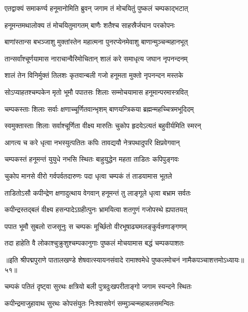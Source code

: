 \twolineshloka
{एतद्वाक्यं समाकर्ण्य हनूमानोमिति ब्रुवन्}
{जगाम तं मोचयितुं पुष्कलं चम्पकाद्भटात्}%

\twolineshloka
{हनूमन्तमथालोक्य तं मोचयितुमागतम्}
{बाणैः शतैश्च साहस्रैर्जघान परकोपनः}%

\twolineshloka
{बाणांस्तान्स बभञ्जाशु मुक्तांस्तेन महात्मना}
{पुनरप्येनमेवाशु बाणान्मुञ्चन्महानभूत्}%

\twolineshloka
{तान्सर्वांश्चूर्णयामास नाराचान्वैरिमोचितान्}
{शालं करे समाधृत्य जघान नृपनन्दनम्}%

\twolineshloka
{शालं तेन विनिर्मुक्तं तिलशः कृतवान्बली}
{गजो हनूमता मुक्तो नृपनन्दन मस्तके}%

\twolineshloka
{सोऽप्याहतश्चम्पकेन मृतो भूमौ पपातसः}
{शिलाः सम्मोचयामास हनूमान्परमास्त्रवित्}%

\twolineshloka
{चम्पकस्ताः शिलाः सर्वाः क्षणाच्चूर्णितवान्भृशम्}
{बाणयन्त्रिकया ब्रह्मन्महच्चित्रमभूदिदम्}%

\twolineshloka
{स्वमुक्तास्ताः शिलाः सर्वाश्चूर्णिता वीक्ष्य मारुतिः}
{चुकोप हृदयेऽत्यतं बहुवीर्यमिति स्मरन्}%

\twolineshloka
{आगत्य च करे धृत्वा नभस्युत्पतितः कपिः}
{तावद्ययौ नेत्रपथादुपरि क्षिप्रवेगवान्}%

\twolineshloka
{चम्पकस्तं हनूमन्तं युयुधे नभसि स्थितः}
{बाहुयुद्धेन महता ताडितः कपिपुङ्गवः}%

\twolineshloka
{चुकोप मानसे वीरो गर्वपर्वतदारुणः}
{पदा धृत्वा चम्पकं तं ताडयामास भूतले}%

\twolineshloka
{ताडितोऽसौ कपीन्द्रेण क्षणादुत्थाय वेगवान्}
{हनूमन्तं तु लाङ्गूले धृत्वा बभ्राम सर्वतः}%

\twolineshloka
{कपीन्द्रस्तद्बलं वीक्ष्य हसन्पादेऽग्रहीत्पुनः}
{भ्रामयित्वा शतगुणं गजोपस्थे ह्यपातयत्}%

\twolineshloka
{पपात भूमौ सुबलो राजसूनुः स चम्पकः}
{मूर्च्छितो वीरभूषाढ्यमलङ्कुर्वन्रणाङ्गणम्}%

\twolineshloka
{तदा हाहेति वै लोकाश्चुक्रुशुश्चम्पकानुगाः}
{पुष्कलं मोचयामास बद्धं चम्पकपाशतः}%

{॥इति श्रीपद्मपुराणे पातालखण्डे शेषवात्स्यायनसंवादे रामाश्वमेधे पुष्कलमोचनं नामैकपञ्चाशत्तमोऽध्यायः॥५१॥}



\twolineshloka
{चम्पकं पतितं दृष्ट्वा सुरथः क्षत्रियो बली}
{पुत्रदुःखपरीताङ्गो जगाम स्यन्दने स्थितः}%

\twolineshloka
{कपीन्द्रमाजुहावाथ सुरथः कोपसंयुतः}
{निःश्वासवेगं सम्मुञ्चन्महाबलसमन्वितः}%

